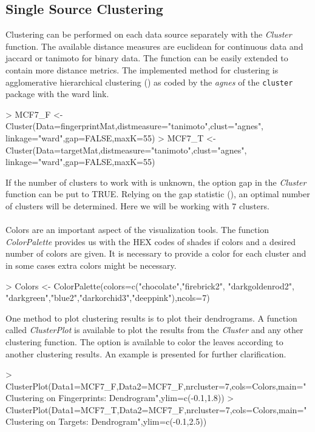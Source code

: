 \documentclass[a4paper]{article}
\begin{document}
\subsection{Single Source Clustering}
Clustering can be performed on each data source separately with the {\it
Cluster} function. The available distance measures are euclidean for continuous
data and jaccard or tanimoto for binary data. The function can be easily
extended to contain more distance metrics. The implemented method for
clustering is agglomerative hierarchical clustering (\cite{Hastie2009}) as coded
by the {\it agnes} of the \texttt{cluster} package with the ward link.
\begin{Schunk}
\begin{Sinput}
> MCF7_F <- Cluster(Data=fingerprintMat,distmeasure="tanimoto",clust="agnes",
                   linkage="ward",gap=FALSE,maxK=55) 
> MCF7_T <- Cluster(Data=targetMat,distmeasure="tanimoto",clust="agnes",
                   linkage="ward",gap=FALSE,maxK=55)
\end{Sinput}
\end{Schunk}
\noindent If the number of clusters to work with is unknown, the option gap in
the {\it Cluster} function can be put to TRUE. Relying on the gap statistic
(\cite{Hastie2009}), an optimal number of clusters will be determined. 
Here we will be working with $7$ clusters.\\ \\
Colors are an important aspect of the visualization tools. The function
{\it ColorPalette} provides us with the HEX codes of shades if colors and a
desired number of colors are given. It is necessary to provide a color for each
cluster and in some cases extra colors might be necessary.
\begin{Schunk}
\begin{Sinput}
> Colors <- ColorPalette(colors=c("chocolate","firebrick2", "darkgoldenrod2",
                        "darkgreen","blue2","darkorchid3","deeppink"),ncols=7) 
\end{Sinput}
\end{Schunk}
\noindent One method to plot clustering results is to plot their dendrograms. A
function called {\it ClusterPlot} is available to plot the results from the {\it Cluster}
and any other clustering function. The option is available to color the leaves
according to another clustering results. An example is presented for further
clarification.
\begin{Schunk}
\begin{Sinput}
> ClusterPlot(Data1=MCF7_F,Data2=MCF7_F,nrcluster=7,cols=Colors,main="Clustering on 
             Fingerprints: Dendrogram",ylim=c(-0.1,1.8))
> ClusterPlot(Data1=MCF7_T,Data2=MCF7_F,nrcluster=7,cols=Colors,main="Clustering on 
             Targets: Dendrogram",ylim=c(-0.1,2.5))
\end{Sinput}
\end{Schunk}
\end{document}
